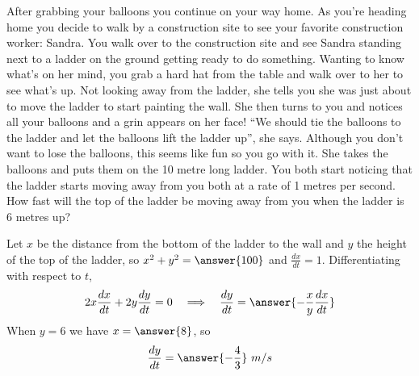 \documentclass{ximera}
\begin{document}
\begin{example}\label{example:8-6}
After grabbing your balloons you continue on your way home. As you're heading home you decide to walk by a construction site to see your favorite construction worker: Sandra. You walk over to the construction site and see Sandra standing next to a ladder on the ground getting ready to do something. Wanting to know what's on her mind, you grab a hard hat from the table and walk over to her to see what's up. Not looking away from the ladder, she tells you she was just about to move the ladder to start painting the wall. She then turns to you and notices all your balloons and a grin appears on her face! ``We should tie the balloons to the ladder and let the balloons lift the ladder up'', she says. Although you don't want to lose the balloons, this seems like fun so you go with it. She takes the balloons and puts them on the 10 metre long ladder. You both start noticing that the ladder starts moving away from you both at a rate of 1 metres per second. How fast will the top of the ladder be moving away from you when the ladder is 6 metres up?

Let $x$ be the distance from the bottom of the ladder to the wall and $y$ the height of the top of the ladder, so $x^{2}+y^{2}=\answer{100}$ and $\frac{dx}{dt}=1$. Differentiating with respect to $t$,
\[
2x\frac{dx}{dt}+2y\frac{dy}{dt}=0
\quad\Longrightarrow\quad
\frac{dy}{dt}=\answer{-\frac{x}{y}\frac{dx}{dt}}
\]
When $y=6$ we have $x=\answer{8}$, so
\[
\frac{dy}{dt}=\answer{-\frac{4}{3}}\ m/s
\]
\end{example}
\end{document}
